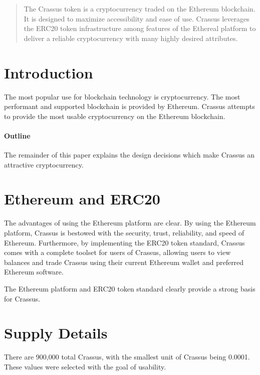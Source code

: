 \documentclass[12pt]{article}
\begin{document}
\maketitle

\begin{abstract}
The Crassus token is a cryptocurrency traded on the Ethereum blockchain.  It is designed to maximize accessibility and ease of use.  Crassus leverages the ERC20 token infrastructure among features of the Ethereal platform to deliver a reliable cryptocurrency with many highly desired attributes.
\end{abstract}

\section{Introduction}
The most popular use for blockchain technology is cryptocurrency.  The most performant and supported blockchain is provided by Ethereum.  Crassus attempts to provide the most usable cryptocurrency on the Ethereum blockchain.

\paragraph{Outline}
The remainder of this paper explains the design decisions which make Crassus an attractive cryptocurrency.

\section{Ethereum and ERC20}\label{Ethereum and ERC20}
The advantages of using the Ethereum platform are clear.  By using the Ethereum platform, Crassus is bestowed with the security, trust, reliability, and speed of Ethereum.  Furthermore, by implementing the ERC20 token standard, Crassus comes with a complete toolset for users of Crassus, allowing users to view balances and trade Crassus using their current Ethereum wallet and preferred Ethereum software.

The Ethereum platform and ERC20 token standard clearly provide a strong basis for Crassus.

\section{Supply Details}\label{Supply Details}
There are 900,000 total Crassus, with the smallest unit of Crassus being 0.0001.  These values were selected with the goal of usability.
\end{document}
